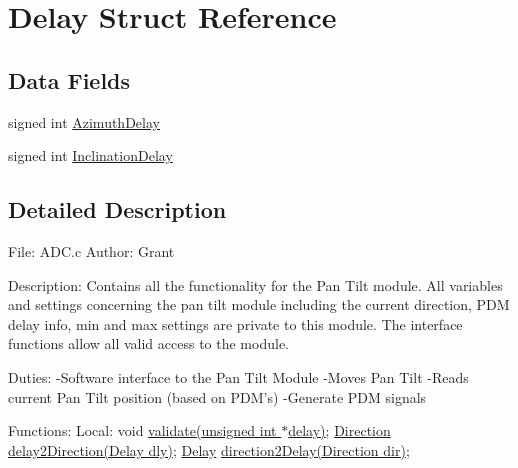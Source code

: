 \hypertarget{structDelay}{\section{Delay Struct Reference}
\label{structDelay}
}
\subsection*{Data Fields}
\begin{DoxyCompactItemize}
\item 
signed int \hyperlink{structDelay_aacc83952fc6c5812597bc96d622f5317}{Azimuth\+Delay}
\item 
signed int \hyperlink{structDelay_a4f5b10a6a07a4aaed02134ab2691b8ec}{Inclination\+Delay}
\end{DoxyCompactItemize}


\subsection{Detailed Description}


 File\+: A\+D\+C.\+c Author\+: Grant

Description\+: Contains all the functionality for the Pan Tilt module. All variables and settings concerning the pan tilt module including the current direction, P\+D\+M delay info, min and max settings are private to this module. The interface functions allow all valid access to the module.

Duties\+: -\/\+Software interface to the Pan Tilt Module -\/\+Moves Pan Tilt -\/\+Reads current Pan Tilt position (based on P\+D\+M's) -\/\+Generate P\+D\+M signals

Functions\+: Local\+: void \hyperlink{PanTilt_8c_a339d46c81d3203b479d9731ef06590d3}{validate(unsigned int $\ast$delay)}; \hyperlink{structDirection}{Direction} \hyperlink{PanTilt_8c_abe8bae9cf0445d5d64cacb685f2bd934}{delay2\+Direction(\+Delay dly)}; \hyperlink{structDelay}{Delay} \hyperlink{PanTilt_8c_a96270ab040ad40095a6c0b24ffb0f994}{direction2\+Delay(\+Direction dir)};

